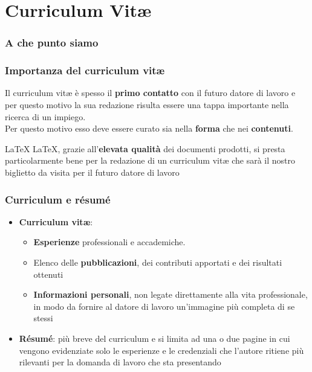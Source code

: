 \documentclass[svgnames,%
	ucs,%
	pdftex]{guitbeamer}
\begin{document}
\section{Curriculum Vit\ae}
\begin{frame}
  \frametitle{A che punto siamo}
\end{frame}
\begin{frame}
  \frametitle{Importanza del curriculum vit\ae}

	Il curriculum vit{\ae} \`e spesso il \textbf{primo contatto} con il futuro datore di
	lavoro e per questo motivo la sua redazione risulta essere una tappa
	importante nella ricerca di un impiego.\\
  \bigskip
	Per questo motivo esso deve essere curato sia nella \textbf{forma} che nei
	\textbf{contenuti}.
  \bigskip
	\begin{block}{\LaTeX}
		\LaTeX, grazie all'\textbf{elevata qualit\`a} dei documenti prodotti,
		si presta particolarmente bene per la redazione di un curriculum vit{\ae} che sar\`a
		il nostro biglietto da visita per il futuro datore di
		lavoro
	\end{block}
\end{frame}
\begin{frame}
  \frametitle{Curriculum e r\'esum\'e}
	\begin{itemize}
	\item \textbf{Curriculum vit{\ae}}:
	\begin{itemize}
		\item \textbf{Esperienze} professionali e accademiche.\medskip
		\item Elenco delle \textbf{pubblicazioni}, dei contributi apportati e dei risultati ottenuti\medskip
		\item \textbf{Informazioni personali}, non legate direttamente alla vita professionale, in modo da fornire al datore di lavoro un'immagine pi\`u completa di se stessi
	\end{itemize}\bigskip
	\item \textbf{R\'esum\'e}: pi\`u breve del curriculum e si limita ad una o due pagine in cui vengono evidenziate solo le esperienze e le credenziali che l'autore ritiene pi\`u rilevanti per la domanda di lavoro che sta presentando
	\end{itemize}
\end{frame}
\end{document}
